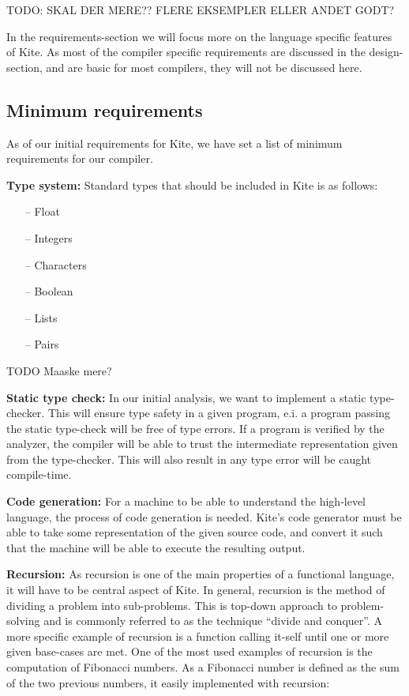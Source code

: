 
TODO: SKAL DER MERE?? FLERE EKSEMPLER ELLER ANDET GODT?

In the requirements-section we will focus more on the language specific features of Kite. As most of the compiler specific requirements are discussed in the design-section, and are basic for most compilers, they will not be discussed here.

\subsection{Minimum requirements}
As of our initial requirements for Kite, we have set a list of minimum requirements for our compiler.

\textbf{Type system:} Standard types that should be included in Kite is as follows:
\begin{itemize}
\item [--] Float
\item [--] Integers
\item [--] Characters
\item [--] Boolean
\item [--] Lists
\item [--] Pairs
\end{itemize}
TODO Maaske mere?

\textbf{Static type check:}
In our initial analysis, we want to implement a static type-checker. This will ensure type safety in a given program, e.i. a program passing the static type-check will be free of type errors. If a program is verified by the analyzer, the compiler will be able to trust the intermediate representation given from the type-checker. This will also result in any type error will be caught compile-time.

\textbf{Code generation:}
For a machine to be able to understand the high-level language, the process of code generation is needed. Kite's code generator must be able to take some representation of the given source code, and convert it such that the machine will be able to execute the resulting output.

\textbf{Recursion:}
As recursion is one of the main properties of a functional language, it will have to be central aspect of Kite. In general, recursion is the method of dividing a problem into sub-problems. This is top-down approach to problem-solving and is commonly referred to as the technique ``divide and conquer''. A more specific example of recursion is a function calling it-self until one or more given base-cases are met. One of the most used examples of recursion is the computation of Fibonacci numbers. As a Fibonacci number is defined as the sum of the two previous numbers, it easily implemented with recursion:

